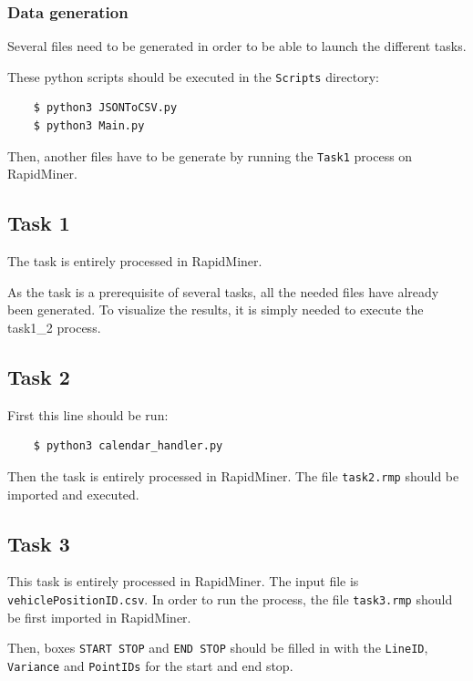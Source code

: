 \documentclass{article}
\begin{document}
\subsubsection{Data generation}

Several files need to be generated in order to be able to launch the different tasks.

These python scripts should be executed in the \texttt{Scripts} directory:

\begin{lstlisting}
    $ python3 JSONToCSV.py
    $ python3 Main.py
\end{lstlisting}

Then, another files have to be generate by running the \texttt{Task1} process on RapidMiner.



\subsection{Task 1}

The task is entirely processed in RapidMiner.

As the task is a prerequisite of several tasks, all the needed files have already been generated. To visualize the results, it is simply needed to execute the task1\_2 process.


\subsection{Task 2}

First this line should be run:

\begin{lstlisting}
    $ python3 calendar_handler.py
\end{lstlisting}

Then the task is entirely processed in RapidMiner. The file \texttt{task2.rmp} should be imported and executed.


\subsection{Task 3}

This task is entirely processed in RapidMiner. The input file is \texttt{vehiclePositionID.csv}. In order to run the process, the file \texttt{task3.rmp} should be first imported in RapidMiner.

Then, boxes \texttt{START STOP} and \texttt{END STOP} should be filled in with the \texttt{LineID}, \texttt{Variance} and \texttt{PointIDs} for the start and end stop.
\end{document}
